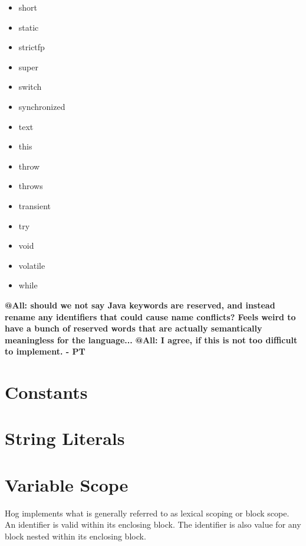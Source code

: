 \documentclass{book}
\begin{document}
\begin{multicols}{4}
\begin{itemize}
  \item[] short
  \item[] static
  \item[] strictfp
  \item[] super
  \item[] switch
  \item[] synchronized
  \item[] text
  \item[] this
  \item[] throw
  \item[] throws
  \item[] transient
  \item[] try
  \item[] void
  \item[] volatile
  \item[] while
\end{itemize}
\rm
\end{multicols}

\textbf{@All: should we not say Java keywords are reserved, and instead rename any
identifiers that could cause name conflicts? Feels weird to have a bunch of
reserved words that are actually semantically meaningless for the language...}
\textbf{@All: I agree, if this is not too difficult to implement. - PT}

\section{Constants} %
\label{sec:constants}


\section{String Literals} %
\label{sec:string_literals}


\section{Variable Scope} %
\label{sec:variable_scope}

Hog implements what is generally referred to as lexical scoping or block scope. An
identifier is valid within its enclosing block. The identifier is also value for
any block nested within its enclosing block.

\end{document}

